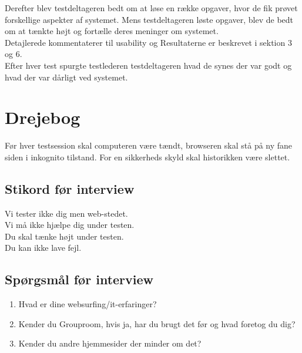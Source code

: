 \documentclass[12pt]{article}
\begin{document}
\noindent Derefter blev testdeltageren bedt om at løse en række opgaver, hvor de fik prøvet forskellige aspekter af systemet. Mens testdeltageren løste opgaver, blev de bedt om at tænkte højt og fortælle deres meninger om systemet.\\
Detajlerede kommentaterer til usability og Resultaterne er beskrevet i sektion 3 og 6.\\
Efter hver test spurgte testlederen testdeltageren hvad de synes der var godt og hvad der var dårligt ved systemet. \\
\section{Drejebog}
Før hver testsession skal computeren være tændt, browseren skal stå på ny fane siden i inkognito tilstand. For en sikkerheds skyld skal historikken være slettet.
\subsection{Stikord før interview}
Vi tester ikke dig men web-stedet. \\
Vi må ikke hjælpe dig under testen. \\
Du skal tænke højt under testen. \\
Du kan ikke lave fejl.
\subsection{Spørgsmål før interview}
\begin{enumerate}
  \item Hvad er dine websurfing/it-erfaringer?
  \item Kender du Grouproom, hvis ja, har du brugt det før og hvad foretog du dig?
  \item Kender du andre hjemmesider der minder om det?
\end{enumerate}
\end{document}
